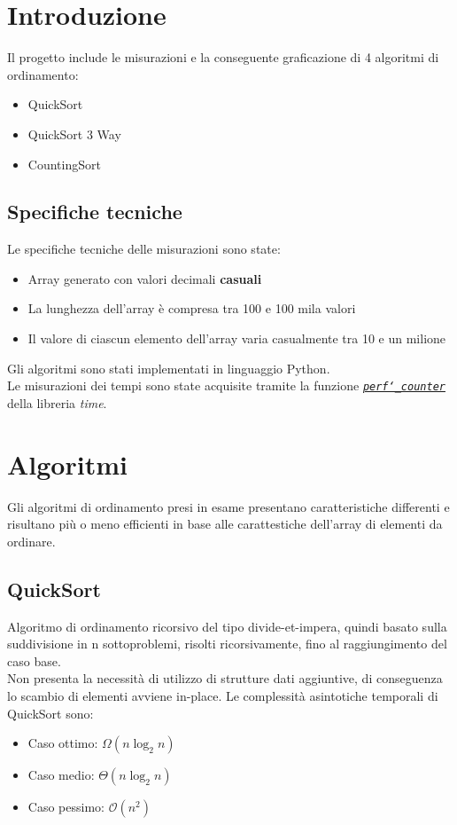\documentclass[a4paper, 11pt]{article}
\newcommand{\myfrontpage}{%
  \begin{titlepage}
  \centering
  \preparefrontpage
  \end{titlepage}
  \global\let\centering\relax %
}
\begin{document}
\myfrontpage

\thispagestyle{empty} 

\newpage

\tableofcontents
\newpage
\section{Introduzione}
Il progetto include le misurazioni e la conseguente graficazione di 4 algoritmi di ordinamento:
\begin{itemize}
    \item QuickSort
    \item QuickSort 3 Way
    \item CountingSort
\end{itemize}
\subsection{Specifiche tecniche}
Le specifiche tecniche delle misurazioni sono state:
\begin{itemize}
    \item Array generato con valori decimali \textbf{casuali}
    \item La lunghezza dell'array è compresa tra 100 e 100 mila valori
    \item Il valore di ciascun elemento dell'array varia casualmente tra 10 e un milione
\end{itemize}
Gli algoritmi sono stati implementati in linguaggio Python. \\
Le misurazioni dei tempi sono state acquisite tramite la funzione \href{https://docs.python.org/3/library/time.html#time.perf_counter}{\textit{\texttt{perf\char`_counter}}} della libreria \textit{time}.

\section{Algoritmi}
Gli algoritmi di ordinamento presi in esame presentano caratteristiche differenti e risultano più o meno efficienti in base alle carattestiche dell'array di elementi da ordinare.

\subsection{QuickSort}
Algoritmo di ordinamento ricorsivo del tipo divide-et-impera, quindi basato sulla suddivisione in n sottoproblemi, risolti ricorsivamente, fino al raggiungimento del caso base.\\
Non presenta la necessità di utilizzo di strutture dati aggiuntive, di conseguenza lo scambio di elementi avviene in-place.\bigbreak
\noindent Le complessità asintotiche temporali di QuickSort sono:
\begin{itemize}
    \item Caso ottimo: $\Omega(n\log_2n)$
    \item Caso medio: $\Theta(n\log_2n)$
    \item Caso pessimo: $\mathcal{O}(n^2)$
\end{itemize}
\end{document}
